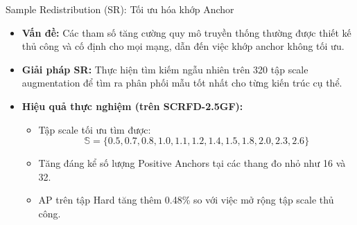 \documentclass[aspectratio=169,11pt]{beamer}
\begin{document}
\begin{frame}{Sample Redistribution (SR): Tối ưu hóa khớp Anchor}
  \begin{itemize}
    \item \textbf{Vấn đề:} Các tham số tăng cường quy mô truyền thống thường được thiết kế thủ công và cố định cho mọi mạng, dẫn đến việc khớp anchor không tối ưu.
    \item \textbf{Giải pháp SR:} Thực hiện tìm kiếm ngẫu nhiên trên 320 tập scale augmentation để tìm ra phân phối mẫu tốt nhất cho từng kiến trúc cụ thể.
    \item \textbf{Hiệu quả thực nghiệm (trên SCRFD-2.5GF):}
      \begin{itemize}
        \item Tập scale tối ưu tìm được:
        \begin{equation}
          \mathbb{S} = \{0.5, 0.7, 0.8, 1.0, 1.1, 1.2, 1.4, 1.5, 1.8, 2.0, 2.3, 2.6\}
        \end{equation}
        \item Tăng đáng kể số lượng Positive Anchors tại các thang đo nhỏ như 16 và 32.
        \item AP trên tập Hard tăng thêm 0.48\% so với việc mở rộng tập scale thủ công.
      \end{itemize}
  \end{itemize}
\end{frame}
\end{document}
